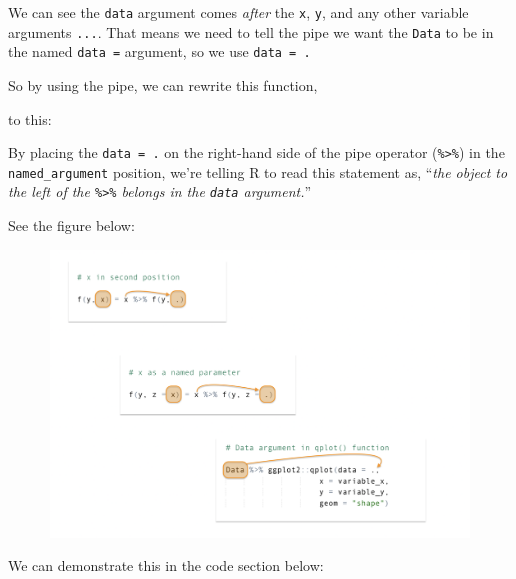 \documentclass[letterpaper,12pt,twoside,]{pinp}
\begin{document}
We can see the \texttt{data} argument comes \emph{after} the \texttt{x},
\texttt{y}, and any other variable arguments \texttt{...}. That means we
need to tell the pipe we want the \texttt{Data} to be in the named
\texttt{data\ =} argument, so we use \texttt{data\ =\ .}

So by using the pipe, we can rewrite this function,

\begin{Shaded}
\begin{Highlighting}[]
\end{Highlighting}
\end{Shaded}

to this:

\begin{Shaded}
\begin{Highlighting}[]
\SpecialCharTok{\%\textgreater{}\%} 
\end{Highlighting}
\end{Shaded}

By placing the \texttt{data\ =\ .} on the right-hand side of the pipe
operator (\texttt{\%\textgreater{}\%}) in the \texttt{named\_argument}
position, we're telling R to read this statement as, ``\emph{the object
to the left of the \texttt{\%\textgreater{}\%} belongs in the
\texttt{data} argument.}''

See the figure below:

\begin{center}\includegraphics[width=6in,height=3in]{../img/pipe-data-args} \end{center}

We can demonstrate this in the code section below:
\end{document}
